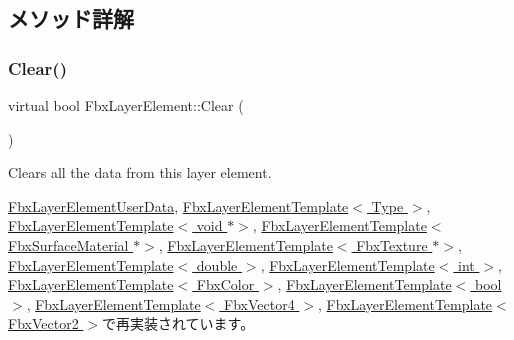 \subsection{メソッド詳解}
\mbox{\label{class_fbx_layer_element_a6ab41d0a26802a359efbbc3b2b12dd3d}} 
\subsubsection{\texorpdfstring{Clear()}{Clear()}}
{\footnotesize\ttfamily virtual bool Fbx\+Layer\+Element\+::\+Clear (\begin{DoxyParamCaption}{ }\end{DoxyParamCaption})\hspace{0.3cm}{\ttfamily [virtual]}}



Clears all the data from this layer element. 



\hyperlink{class_fbx_layer_element_user_data_aa945631c932f3c811013c903e5ecf55e}{Fbx\+Layer\+Element\+User\+Data}, \hyperlink{class_fbx_layer_element_template_abe029dd81aa956b415b9534aa3536bf0}{Fbx\+Layer\+Element\+Template$<$ Type $>$}, \hyperlink{class_fbx_layer_element_template_abe029dd81aa956b415b9534aa3536bf0}{Fbx\+Layer\+Element\+Template$<$ void $\ast$$>$}, \hyperlink{class_fbx_layer_element_template_abe029dd81aa956b415b9534aa3536bf0}{Fbx\+Layer\+Element\+Template$<$ Fbx\+Surface\+Material $\ast$$>$}, \hyperlink{class_fbx_layer_element_template_abe029dd81aa956b415b9534aa3536bf0}{Fbx\+Layer\+Element\+Template$<$ Fbx\+Texture $\ast$$>$}, \hyperlink{class_fbx_layer_element_template_abe029dd81aa956b415b9534aa3536bf0}{Fbx\+Layer\+Element\+Template$<$ double $>$}, \hyperlink{class_fbx_layer_element_template_abe029dd81aa956b415b9534aa3536bf0}{Fbx\+Layer\+Element\+Template$<$ int $>$}, \hyperlink{class_fbx_layer_element_template_abe029dd81aa956b415b9534aa3536bf0}{Fbx\+Layer\+Element\+Template$<$ Fbx\+Color $>$}, \hyperlink{class_fbx_layer_element_template_abe029dd81aa956b415b9534aa3536bf0}{Fbx\+Layer\+Element\+Template$<$ bool $>$}, \hyperlink{class_fbx_layer_element_template_abe029dd81aa956b415b9534aa3536bf0}{Fbx\+Layer\+Element\+Template$<$ Fbx\+Vector4 $>$}, \hyperlink{class_fbx_layer_element_template_abe029dd81aa956b415b9534aa3536bf0}{Fbx\+Layer\+Element\+Template$<$ Fbx\+Vector2 $>$}で再実装されています。

